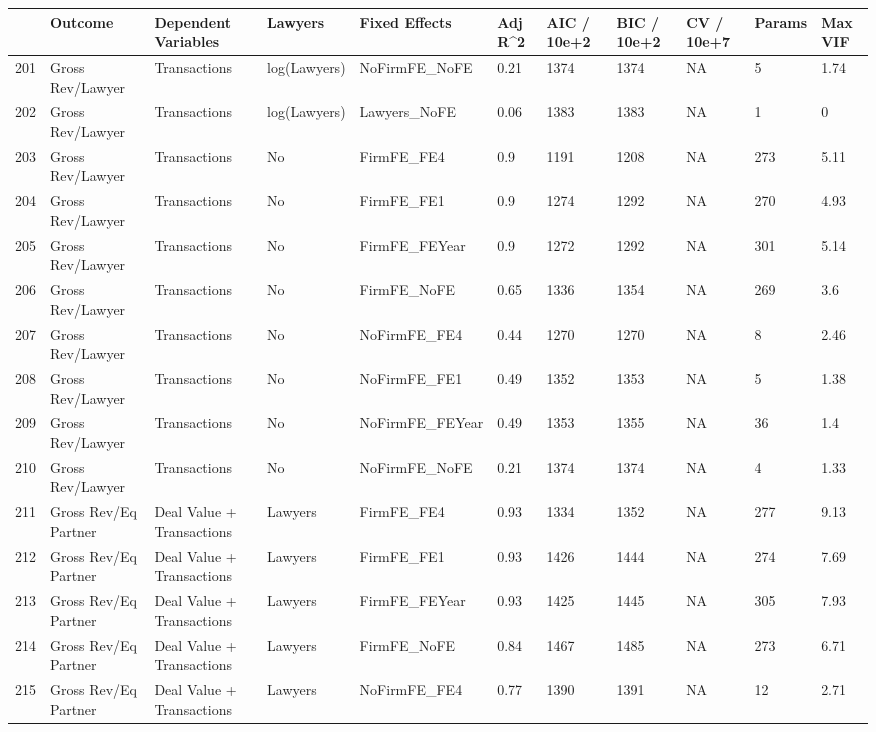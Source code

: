 \begin{table}[ht]
\centering
\begin{tabular}{rllllllllll}
  \hline
 & Outcome & Dependent Variables & Lawyers & Fixed Effects & Adj R^2 & AIC / 10e+2 & BIC / 10e+2 & CV / 10e+7 & Params & Max VIF \\ 
  \hline
201 & Gross Rev/Lawyer & Transactions & log(Lawyers) & NoFirmFE\_NoFE & 0.21 & 1374 & 1374 & NA & 5 & 1.74 \\ 
  202 & Gross Rev/Lawyer & Transactions & log(Lawyers) & Lawyers\_NoFE & 0.06 & 1383 & 1383 & NA & 1 & 0 \\ 
  203 & Gross Rev/Lawyer & Transactions & No & FirmFE\_FE4 & 0.9 & 1191 & 1208 & NA & 273 & 5.11 \\ 
  204 & Gross Rev/Lawyer & Transactions & No & FirmFE\_FE1 & 0.9 & 1274 & 1292 & NA & 270 & 4.93 \\ 
  205 & Gross Rev/Lawyer & Transactions & No & FirmFE\_FEYear & 0.9 & 1272 & 1292 & NA & 301 & 5.14 \\ 
  206 & Gross Rev/Lawyer & Transactions & No & FirmFE\_NoFE & 0.65 & 1336 & 1354 & NA & 269 & 3.6 \\ 
  207 & Gross Rev/Lawyer & Transactions & No & NoFirmFE\_FE4 & 0.44 & 1270 & 1270 & NA & 8 & 2.46 \\ 
  208 & Gross Rev/Lawyer & Transactions & No & NoFirmFE\_FE1 & 0.49 & 1352 & 1353 & NA & 5 & 1.38 \\ 
  209 & Gross Rev/Lawyer & Transactions & No & NoFirmFE\_FEYear & 0.49 & 1353 & 1355 & NA & 36 & 1.4 \\ 
  210 & Gross Rev/Lawyer & Transactions & No & NoFirmFE\_NoFE & 0.21 & 1374 & 1374 & NA & 4 & 1.33 \\ 
  211 & Gross Rev/Eq Partner & Deal Value + Transactions & Lawyers & FirmFE\_FE4 & 0.93 & 1334 & 1352 & NA & 277 & 9.13 \\ 
  212 & Gross Rev/Eq Partner & Deal Value + Transactions & Lawyers & FirmFE\_FE1 & 0.93 & 1426 & 1444 & NA & 274 & 7.69 \\ 
  213 & Gross Rev/Eq Partner & Deal Value + Transactions & Lawyers & FirmFE\_FEYear & 0.93 & 1425 & 1445 & NA & 305 & 7.93 \\ 
  214 & Gross Rev/Eq Partner & Deal Value + Transactions & Lawyers & FirmFE\_NoFE & 0.84 & 1467 & 1485 & NA & 273 & 6.71 \\ 
  215 & Gross Rev/Eq Partner & Deal Value + Transactions & Lawyers & NoFirmFE\_FE4 & 0.77 & 1390 & 1391 & NA & 12 & 2.71 \\ 

\end{tabular}
\end{table}
